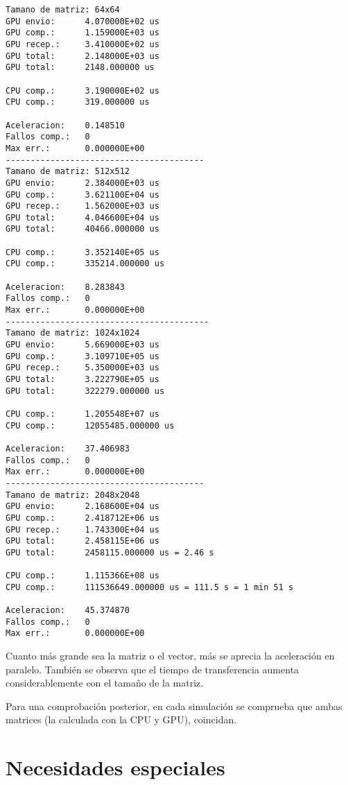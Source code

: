 \documentclass[12pt,a4paper]{article}
\begin{document}
\begin{lstlisting}
Tamano de matriz: 64x64
GPU envio:      4.070000E+02 us
GPU comp.:      1.159000E+03 us
GPU recep.:     3.410000E+02 us
GPU total:      2.148000E+03 us
GPU total:      2148.000000 us

CPU comp.:      3.190000E+02 us
CPU comp.:      319.000000 us

Aceleracion:    0.148510
Fallos comp.:   0
Max err.:       0.000000E+00
----------------------------------------
Tamano de matriz: 512x512
GPU envio:      2.384000E+03 us
GPU comp.:      3.621100E+04 us
GPU recep.:     1.562000E+03 us
GPU total:      4.046600E+04 us
GPU total:      40466.000000 us

CPU comp.:      3.352140E+05 us
CPU comp.:      335214.000000 us

Aceleracion:    8.283843
Fallos comp.:   0
Max err.:       0.000000E+00
-----------------------------------------
Tamano de matriz: 1024x1024
GPU envio:      5.669000E+03 us
GPU comp.:      3.109710E+05 us
GPU recep.:     5.350000E+03 us
GPU total:      3.222790E+05 us
GPU total:      322279.000000 us

CPU comp.:      1.205548E+07 us
CPU comp.:      12055485.000000 us

Aceleracion:    37.406983
Fallos comp.:   0
Max err.:       0.000000E+00
----------------------------------------
Tamano de matriz: 2048x2048
GPU envio:      2.168600E+04 us
GPU comp.:      2.418712E+06 us
GPU recep.:     1.743300E+04 us
GPU total:      2.458115E+06 us
GPU total:      2458115.000000 us = 2.46 s

CPU comp.:      1.115366E+08 us
CPU comp.:      111536649.000000 us = 111.5 s = 1 min 51 s

Aceleracion:    45.374870
Fallos comp.:   0
Max err.:       0.000000E+00
\end{lstlisting}

Cuanto más grande sea la matriz o el vector, más se aprecia la aceleración en
paralelo. También se observa que el tiempo de transferencia aumenta 
considerablemente con el tamaño de la matriz.

Para una comprobación posterior, en cada simulación se comprueba que ambas 
matrices (la calculada con la CPU y GPU), coincidan.



\section{Necesidades especiales}
\end{document}

